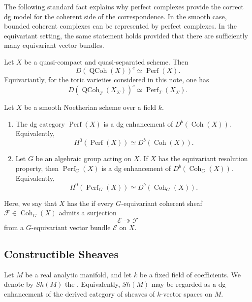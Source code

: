 {The following standard fact explains why perfect complexes provide the
correct dg model for the coherent side of the correspondence.  In the
smooth case, bounded coherent complexes can be represented by perfect
complexes.  In the equivariant setting, the same statement holds
provided that there are sufficiently many equivariant vector bundles.
\begin{theorem}
\label{thm:perfect-complexes-as-compact-objects}
Let \(X\) be a quasi-compact and quasi-separated scheme. Then
\[
D(\operatorname{QCoh}(X))^c \simeq \operatorname{Perf}(X).
\]
Equivariantly, for the toric varieties considered in this note, one has
\[
D(\operatorname{QCoh}_T(X_\Sigma))^c
\simeq
\operatorname{Perf}_T(X_\Sigma).
\]
\end{theorem}
\begin{theorem}
Let \(X\) be a smooth Noetherian scheme over a field \(k\).
\begin{enumerate}
    \item The dg category \(\operatorname{Perf}(X)\) is a dg enhancement
    of \(D^b(\operatorname{Coh}(X))\).  Equivalently,
    \[
    H^0(\operatorname{Perf}(X))
    \simeq
    D^b(\operatorname{Coh}(X)).
    \]

    \item Let \(G\) be an algebraic group acting on \(X\).  If \(X\) has
    the equivariant resolution property, then
    \(\operatorname{Perf}_G(X)\) is a dg enhancement of
    \(D^b(\operatorname{Coh}_G(X))\).  Equivalently,
    \[
    H^0(\operatorname{Perf}_G(X))
    \simeq
    D^b(\operatorname{Coh}_G(X)).
    \]
\end{enumerate}
\end{theorem}

Here, we say that \(X\) has the 
if every \(G\)-equivariant coherent sheaf
\(\mathcal F\in \operatorname{Coh}_G(X)\) admits a surjection
\[
\mathcal E\twoheadrightarrow \mathcal F
\]
from a \(G\)-equivariant vector bundle \(\mathcal E\) on \(X\).



\subsection{Constructible Sheaves}

Let \(M\) be a real analytic manifold, and let \(k\) be a fixed field of
coefficients.  We denote by \(Sh(M)\) the .  Equivalently,
\(Sh(M)\) may be regarded as a dg enhancement of the derived category of
sheaves of \(k\)-vector spaces on \(M\).

}
